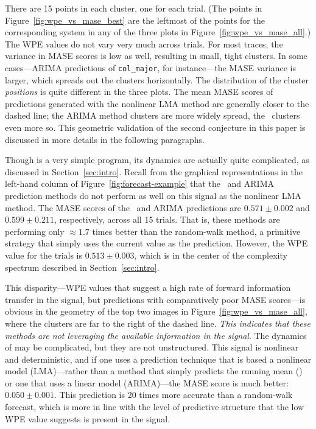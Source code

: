 There are 15 points in each cluster, one for each trial.  (The points
in Figure~\ref{fig:wpe_vs_mase_best} are the leftmost of the points
for the corresponding system in any of the three plots in
Figure~\ref{fig:wpe_vs_mase_all}.)  The WPE values do not vary very
much across trials.  For most traces, the variance in MASE scores is
low as well, resulting in small, tight clusters.  In some
cases---ARIMA predictions of {\tt col\_major}, for instance---the
MASE variance is larger, which spreads out the clusters
horizontally.  The distribution of the cluster {\sl positions} is
quite different in the three plots.  The mean MASE scores of
predictions generated with the nonlinear LMA method are generally
closer to the dashed line; the ARIMA method clusters are more
widely spread, the \naive ~clusters even more so.  This geometric
validation of the second conjecture in this paper is discussed in more
details in the following paragraphs.

Though \col is a very simple program, its dynamics are actually quite
complicated, as discussed in Section~\ref{sec:intro}.  Recall from the
graphical representations in the left-hand column of
Figure~\ref{fig:forecast-example} that the \naive ~and ARIMA
prediction methods do not perform as well on this signal as the
nonlinear LMA method.  The MASE scores of the \naive ~and ARIMA
predictions are $0.571 \pm 0.002$ and $0.599 \pm 0.211$, respectively,
across all 15 trials.  That is, these methods are performing only
$\approx 1.7$ times better than the random-walk method, a primitive
strategy that simply uses the current value as the prediction.
However, the WPE value for the \col trials is $0.513 \pm 0.003$, which
is in the center of the complexity spectrum described in
Section~\ref{sec:intro}.

This disparity---WPE values that suggest a high rate of forward
information transfer in the signal, but predictions with comparatively
poor MASE scores---is obvious in the geometry of the top two images
in Figure~\ref{fig:wpe_vs_mase_all}, where the \col clusters are far
to the right of the dashed line.  \emph{This indicates that these
  methods are not leveraging the available information in the signal}.
The dynamics of \col may be complicated, but they are not
unstructured.  This signal is nonlinear and deterministic, and if one
uses a prediction technique that is based a nonlinear model
(LMA)---rather than a method that simply predicts the running mean
(\naive) or one that uses a linear model (ARIMA)---the MASE score is
much better: $0.050 \pm 0.001$.  This prediction is 20 times more
accurate than a random-walk forecast, which is more in line with the
level of predictive structure that the low WPE value suggests is
present in the signal.  

